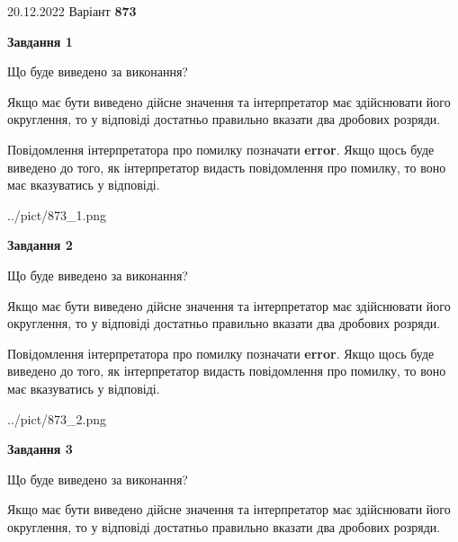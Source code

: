 \documentclass[12pt, ukrainian]{article}
\begin{document}
{20.12.2022 Варіант \No \textbf { 873 }\par}
{
\begin {Large}

{\begin {center}\textbf{Завдання 1}\end {center}}\par
Що буде виведено за виконання? \par

Якщо має бути виведено дійсне значення та інтерпретатор має здійснювати його округлення, 
то у відповіді достатньо правильно вказати два дробових розряди.

Повідомлення інтерпретатора про помилку позначати \textbf{error}.
Якщо щось буде виведено до того, як інтерпретатор видасть повідомлення про помилку, 
то воно має вказуватись у відповіді. \par

\begin{center}
	{../pict/873_1.png}
\end{center}
\newpage

{\begin {center}\textbf{Завдання 2}\end {center}}\par
Що буде виведено за виконання? \par

Якщо має бути виведено дійсне значення та інтерпретатор має здійснювати його округлення, 
то у відповіді достатньо правильно вказати два дробових розряди.

Повідомлення інтерпретатора про помилку позначати \textbf{error}.
Якщо щось буде виведено до того, як інтерпретатор видасть повідомлення про помилку, 
то воно має вказуватись у відповіді. \par

\begin{center}
	{../pict/873_2.png}
\end{center}
\newpage

{\begin {center}\textbf{Завдання 3}\end {center}}\par
Що буде виведено за виконання? \par

Якщо має бути виведено дійсне значення та інтерпретатор має здійснювати його округлення, 
то у відповіді достатньо правильно вказати два дробових розряди.


\end{Large}}
\end{document}
